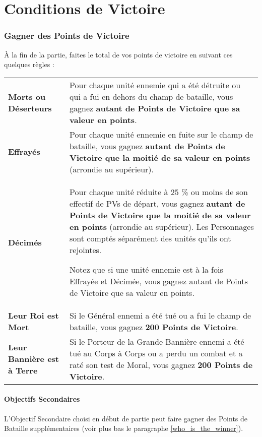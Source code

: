 
\part{Conditions de Victoire}
\label{scoring_and_victory_conditions}

\section{Gagner des Points de Victoire}

À la fin de la partie, faites le total de vos points de victoire en suivant ces quelques règles :

\noindent\begin{tabular}{>{\bfseries\raggedleft}p{2.2cm}p{13.5cm}}
Morts ou Déserteurs & Pour chaque unité ennemie qui a été détruite ou qui a fui en dehors du champ de bataille, vous gagnez \textbf{autant de Points de Victoire que sa valeur en points}. \tabularnewline
Effrayés & Pour chaque unité ennemie en fuite sur le champ de bataille, vous gagnez \textbf{autant de Points de Victoire que la moitié de sa valeur en points} (arrondie au supérieur). \tabularnewline
Décimés & Pour chaque unité réduite à 25 \% ou moins de son effectif de PVs de départ, vous gagnez \textbf{autant de Points de Victoire que la moitié de sa valeur en points} (arrondie au supérieur). Les Personnages sont comptés séparément des unités qu'ils ont rejointes.

Notez que si une unité ennemie est à la fois Effrayée et Décimée, vous gagnez autant de Points de Victoire que sa valeur en points. \tabularnewline
Leur Roi est Mort & Si le Général ennemi a été tué ou a fui le champ de bataille, vous gagnez \textbf{200 Points de Victoire}. \tabularnewline
Leur Bannière est à Terre & Si le Porteur de la Grande Bannière ennemi a été tué au Corps à Corps ou a perdu un combat et a raté son test de Moral, vous gagnez \textbf{200 Points de Victoire}. \tabularnewline
\end{tabular}

\hypertarget{secondaryobjectives}{\subsection{Objectifs Secondaires}}
\label{secondary_objectives}

L'Objectif Secondaire choisi en début de partie peut faire gagner des Points de Bataille supplémentaires (voir plus bas le paragraphe \ref{who_is_the_winner}).

